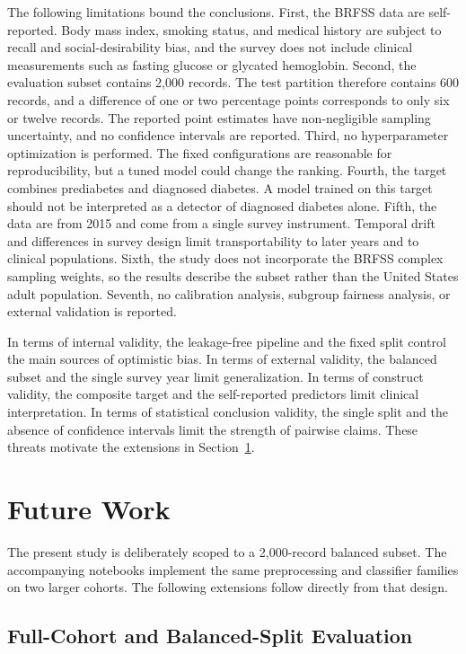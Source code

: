\documentclass[conference]{IEEEtran}
\begin{document}
The following limitations bound the conclusions. First, the BRFSS data are self-reported. Body mass index, smoking status, and medical history are subject to recall and social-desirability bias, and the survey does not include clinical measurements such as fasting glucose or glycated hemoglobin. Second, the evaluation subset contains 2,000 records. The test partition therefore contains 600 records, and a difference of one or two percentage points corresponds to only six or twelve records. The reported point estimates have non-negligible sampling uncertainty, and no confidence intervals are reported. Third, no hyperparameter optimization is performed. The fixed configurations are reasonable for reproducibility, but a tuned model could change the ranking. Fourth, the target combines prediabetes and diagnosed diabetes. A model trained on this target should not be interpreted as a detector of diagnosed diabetes alone. Fifth, the data are from 2015 and come from a single survey instrument. Temporal drift and differences in survey design limit transportability to later years and to clinical populations. Sixth, the study does not incorporate the BRFSS complex sampling weights, so the results describe the subset rather than the United States adult population. Seventh, no calibration analysis, subgroup fairness analysis, or external validation is reported.

In terms of internal validity, the leakage-free pipeline and the fixed split control the main sources of optimistic bias. In terms of external validity, the balanced subset and the single survey year limit generalization. In terms of construct validity, the composite target and the self-reported predictors limit clinical interpretation. In terms of statistical conclusion validity, the single split and the absence of confidence intervals limit the strength of pairwise claims. These threats motivate the extensions in Section~\ref{sec:future}.

\section{Future Work}
\label{sec:future}

The present study is deliberately scoped to a 2,000-record balanced subset. The accompanying notebooks implement the same preprocessing and classifier families on two larger cohorts. The following extensions follow directly from that design.

\subsection{Full-Cohort and Balanced-Split Evaluation}
\end{document}
